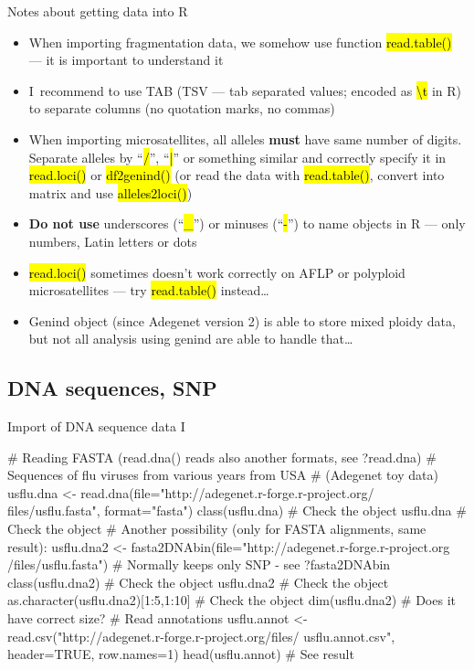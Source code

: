 \documentclass[compress, ucs, xelatex, 11pt, xcolor=svgnames,
  hyperref={
    bookmarks=true,
    unicode=true,
    colorlinks=true,
    pdftitle={Molecular data in R},
    plainpages=false,
    pdfauthor={Vojtech Zeisek},
    pdfsubject={Course about phylogeny and evolution in R},
    pdfcreator={XeLaTeX},
    pdfkeywords={R, evolution, phylogeny, molecular data},
    linkcolor=Tomato,
    anchorcolor=SaddleBrown,
    citecolor=Goldenrod,
    filecolor=DarkMagenta,
    menucolor=Sienna,
    urlcolor=DarkTurquoise,
    pdftex},
  url={hyphens, lowtilde} %
  ]{beamer}
\renewcommand{\texttt}[1]{\hl{\ttfamily #1}}
\begin{document}
\begin{frame}{Notes about getting data into R}
  \begin{itemize}
    \item When importing fragmentation data, we somehow use function \texttt{read.table()} --- it is important to understand it
    \item I~recommend to use TAB (TSV --- tab separated values; encoded as \texttt{\textbackslash t} in R) to separate columns (no quotation marks, no commas)
    \item When importing microsatellites, all alleles \textbf{must} have same number of digits. Separate alleles by ``\texttt{/}'', ``\texttt{|}'' or something similar and correctly specify it in \texttt{read.loci()} or \texttt{df2genind()} (or read the data with \texttt{read.table()}, convert into matrix and use \texttt{alleles2loci()})
    \item \textbf{Do not use} underscores (``\texttt{\_}'') or minuses (``\texttt{-}'') to name objects in R --- only numbers, Latin letters or dots
    \item \texttt{read.loci()} sometimes doesn't work correctly on AFLP or polyploid microsatellites --- try \texttt{read.table()} instead\ldots
    \item Genind object (since Adegenet version 2) is able to store mixed ploidy data, but not all analysis using genind are able to handle that\ldots
  \end{itemize}
\end{frame}

\subsection{DNA sequences, SNP}

\begin{frame}[fragile]{Import of DNA sequence data I}
  \begin{spluscode}
    # Reading FASTA (read.dna() reads also another formats, see ?read.dna)
    # Sequences of flu viruses from various years from USA
    # (Adegenet toy data)
    usflu.dna <- read.dna(file="http://adegenet.r-forge.r-project.org/
      files/usflu.fasta", format="fasta")
    class(usflu.dna) # Check the object
    usflu.dna # Check the object
    # Another possibility (only for FASTA alignments, same result):
    usflu.dna2 <- fasta2DNAbin(file="http://adegenet.r-forge.r-project.org
      /files/usflu.fasta") # Normally keeps only SNP - see ?fasta2DNAbin
    class(usflu.dna2) # Check the object
    usflu.dna2 # Check the object
    as.character(usflu.dna2)[1:5,1:10] # Check the object
    dim(usflu.dna2) # Does it have correct size?
    # Read annotations
    usflu.annot <- read.csv("http://adegenet.r-forge.r-project.org/files/
      usflu.annot.csv", header=TRUE, row.names=1)
    head(usflu.annot) # See result
  \end{spluscode}
\end{frame}
\end{document}
